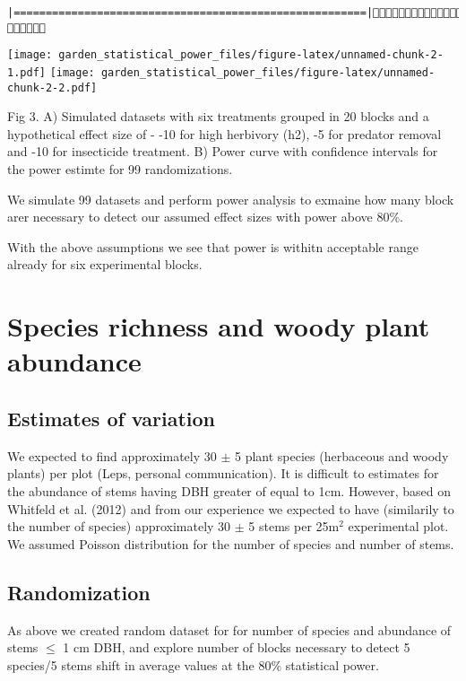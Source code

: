 \documentclass[]{article}
\begin{document}
\begin{verbatim}
|=======================================================|(4/4) 
\end{verbatim}

\texttt{[image: garden\_statistical\_power\_files/figure-latex/unnamed-chunk-2-1.pdf]}
\texttt{[image: garden\_statistical\_power\_files/figure-latex/unnamed-chunk-2-2.pdf]}

Fig 3. A) Simulated datasets with six treatments grouped in 20 blocks
and a hypothetical effect size of - -10 for high herbivory (h2), -5 for
predator removal and -10 for insecticide treatment. B) Power curve with
confidence intervals for the power estimte for 99 randomizations.

We simulate 99 datasets and perform power analysis to exmaine how many
block arer necessary to detect our assumed effect sizes with power above
80\%.

With the above assumptions we see that power is withitn acceptable range
already for six experimental blocks.

\section{Species richness and woody plant
abundance}\label{species-richness-and-woody-plant-abundance}

\subsection{Estimates of variation}\label{estimates-of-variation-1}

We expected to find approximately 30 \(\pm\) 5 plant species (herbaceous
and woody plants) per plot (Leps, personal communication). It is
difficult to estimates for the abundance of stems having DBH greater of
equal to 1cm. However, based on Whitfeld et al. (2012) and from our
experience we expected to have (similarily to the number of species)
approximately 30 \(\pm\) 5 stems per 25m\(^2\) experimental plot. We
assumed Poisson distribution for the number of species and number of
stems.

\subsection{Randomization}\label{randomization-1}

As above we created random dataset for for number of species and
abundance of stems \(\leq\) 1 cm DBH, and explore number of blocks
necessary to detect 5 species/5 stems shift in average values at the
80\% statistical power.
\end{document}
